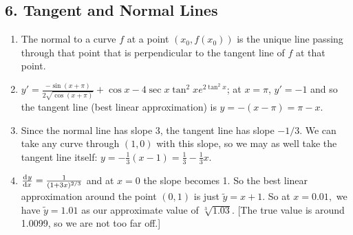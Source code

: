\subsection*{6. Tangent and Normal Lines}
\begin{enumerate}
  \item The normal to a curve $ f $ at a point $ (x_0, f(x_0)) $ is the unique line passing through that point that
        is perpendicular to the tangent line of $ f $ at that point.
  \item $ y' = \frac{-\sin(x + \pi)}{2\sqrt{\cos(x + \pi)}} + \cos x - 4\sec x \tan^2 x e^{2\tan^2 x} $; at $ x = \pi $, $ y' = -1 $
        and so the tangent line (best linear approximation) is $ y = -(x - \pi) = \pi - x $.
  \item Since the normal line has slope 3, the tangent line has slope $ -1/3 $. We can take any curve through $ (1,0) $ with this slope,
        so we may as well take the tangent line itself: $ y = -\frac{1}{3}(x - 1) = \frac{1}{3} -\frac{1}{3}x $.
  \item $ \od{y}{x} = \frac{1}{(1 + 3x)^{2/3}} $ and at $ x = 0 $ the slope becomes 1. So the best linear approximation around the point $ (0, 1) $
        is just $ \tilde y = x + 1 $. So at $ x = 0.01, $ we have $ \tilde y = 1.01 $ as our approximate value of $ \sqrt[3]{1.03} $. [The true value
        is around 1.0099, so we are not too far off.]
\end{enumerate}

